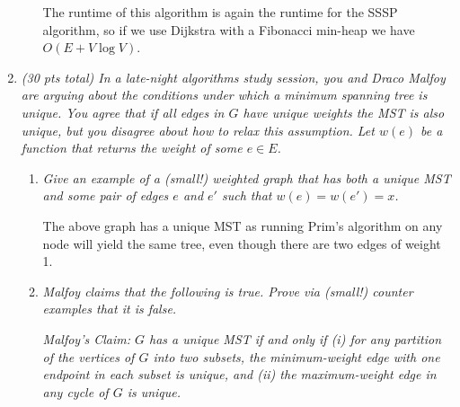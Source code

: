 \documentclass[12pt]{article}
\begin{document}
\begin{enumerate}
\begin{enumerate}
        The runtime of this algorithm is again the runtime for the SSSP algorithm, so if we use Dijkstra with a Fibonacci min-heap we have $O(E+V\log V)$.
         
    \end{enumerate}
    
    
    \newpage
    \item \textit{(30 pts total) In a late-night algorithms study session, you and Draco Malfoy are arguing about the conditions under which a minimum 
spanning tree is unique. You agree that if all edges in $G$ have unique weights the MST is also unique, but you disagree about how to relax this assumption. 
Let $w(e)$ be a function that returns the weight of some $e \in E$.}
    \begin{enumerate}
         \item \textit{Give an example of a (small!) weighted graph that has both a unique MST and some pair of edges $e$ and $e'$ such that $w(e) = w(e') = 
x$.}
         \begin{center}
         \end{center}
         
         The above graph has a unique MST as running Prim's algorithm on any node will yield the same tree, even though there are two edges of weight 1.\\
         
         \item \textit{Malfoy claims that the following is true. Prove via (small!) counter examples that it is false.}
         
         \textit{Malfoy's Claim: $G$ has a unique MST if and only if (i) for any partition of the vertices of $G$ into two subsets, the minimum-weight edge 
with one endpoint in each subset is unique, and (ii) the maximum-weight edge in any cycle of $G$ is unique.}
         

\end{enumerate}
\end{enumerate}
\end{document}
